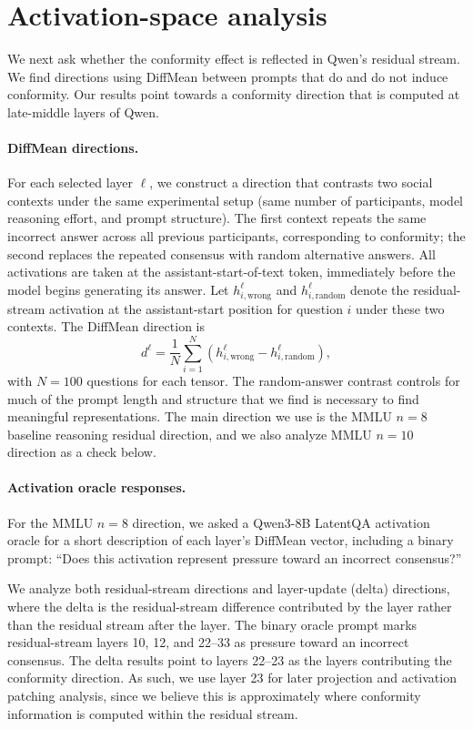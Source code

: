 \section{Activation-space analysis}
\label{sec:qwen-activation-projection}

We next ask whether the conformity effect is reflected in Qwen's residual
stream. We find directions using DiffMean between prompts that do and do not induce conformity. Our results point towards a conformity direction that is computed at late-middle layers of Qwen.

\paragraph{DiffMean directions.}
For each selected layer $\ell$, we construct a direction that contrasts two social contexts under the same experimental setup (same number of participants, model reasoning effort, and prompt structure). The first context repeats the same incorrect answer across all previous participants, corresponding to conformity; the second replaces the repeated consensus with random alternative answers. All activations are taken at the assistant-start-of-text token, immediately before the model begins generating its answer.
Let
$h^\ell_{i,\mathrm{wrong}}$ and $h^\ell_{i,\mathrm{random}}$ denote the
residual-stream activation at the assistant-start position for question $i$ under
these two contexts. The DiffMean direction is
\[
  d^\ell =
  \frac{1}{N}\sum_{i=1}^{N}
  \left(h^\ell_{i,\mathrm{wrong}} - h^\ell_{i,\mathrm{random}}\right),
\]
with $N=100$ questions for each tensor. The random-answer contrast controls for much of
the prompt length and structure that we find is necessary to find meaningful representations. The main direction we use is the MMLU
$n=8$ baseline reasoning residual direction, and we also analyze MMLU $n=10$ direction as a check below.

\paragraph{Activation oracle responses.}
For the MMLU $n=8$ direction, we asked a Qwen3-8B LatentQA activation oracle
for a short description of each layer's DiffMean vector, including a binary
prompt: ``Does this activation represent pressure toward an incorrect
consensus?''

We analyze both residual-stream directions and layer-update (delta) directions,
where the delta is the residual-stream difference contributed by the layer rather
than the residual stream after the layer. The binary oracle prompt marks
residual-stream layers 10, 12, and 22--33 as pressure toward an incorrect
consensus. The delta results point to layers 22--23 as the layers contributing
the conformity direction. As such, we use layer 23 for later projection and activation patching analysis, since we believe this is approximately where conformity information is computed within the residual stream.

